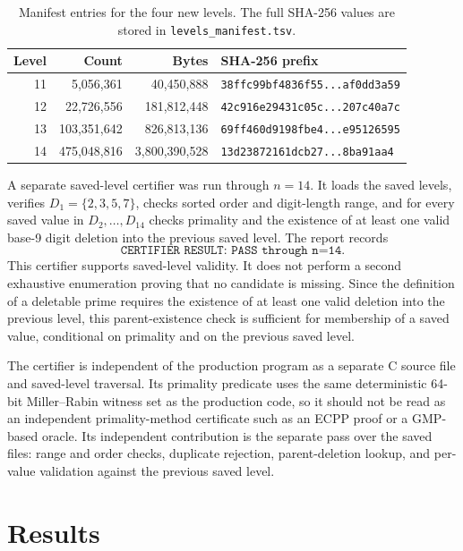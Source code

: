 \documentclass[11pt]{article}
\theoremstyle{definition}
\theoremstyle{remark}
\begin{document}
\begin{table}[ht]
\centering
\small
\begin{tabular}{r r r l}
\toprule
Level & Count & Bytes & SHA-256 prefix\\
\midrule
11 & 5,056,361 & 40,450,888 & \texttt{38ffc99bf4836f55...af0dd3a59}\\
12 & 22,726,556 & 181,812,448 & \texttt{42c916e29431c05c...207c40a7c}\\
13 & 103,351,642 & 826,813,136 & \texttt{69ff460d9198fbe4...e95126595}\\
14 & 475,048,816 & 3,800,390,528 & \texttt{13d23872161dcb27...8ba91aa4}\\
\bottomrule
\end{tabular}
\caption{Manifest entries for the four new levels.  The full SHA-256 values
are stored in \texttt{levels\_manifest.tsv}.}
\label{tab:manifest}
\end{table}

A separate saved-level certifier was run through \(n=14\).  It loads the
saved levels, verifies \(D_1=\{2,3,5,7\}\), checks sorted order and
digit-length range, and for every saved value in \(D_2,\ldots,D_{14}\)
checks primality and the existence of at least one valid base-9 digit
deletion into the previous saved level.  The report records
\[
  \texttt{CERTIFIER RESULT: PASS through n=14}.
\]
This certifier supports saved-level validity.  It does not perform a second
exhaustive enumeration proving that no candidate is missing.  Since the
definition of a deletable prime requires the existence of at least one valid
deletion into the previous level, this parent-existence check is sufficient
for membership of a saved value, conditional on primality and on the previous
saved level.

The certifier is independent of the production program as a separate C
source file and saved-level traversal.  Its primality predicate uses the same
deterministic 64-bit Miller--Rabin witness set as the production code, so it
should not be read as an independent primality-method certificate such as an
ECPP proof or a GMP-based oracle.  Its independent contribution is the
separate pass over the saved files: range and order checks, duplicate
rejection, parent-deletion lookup, and per-value validation against the
previous saved level.

\section{Results}
\label{sec:results}
\end{document}
